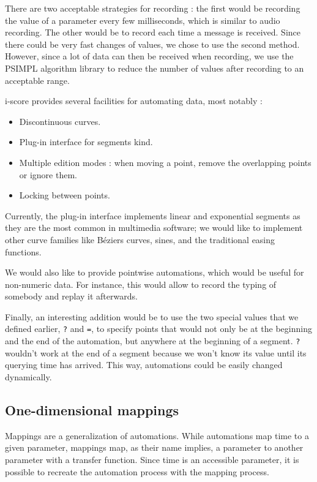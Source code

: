 \documentclass{sigchi}
\begin{document}
There are two acceptable strategies for recording : the first would be recording the value of a parameter every few milliseconds, which is similar to audio recording. The other would be to record each time a message is received. Since there could be very fast changes of values, we chose to use the second method.
However, since a lot of data can then be received when recording, we use the PSIMPL\cite{psimpl} algorithm library to reduce the number of values after recording to an acceptable range.

i-score provides several facilities for automating data, most notably : 
\begin{itemize}
    \item Discontinuous curves.
    \item Plug-in interface for segments kind.
    \item Multiple edition modes : when moving a point, remove the overlapping points or ignore them.
    \item Locking between points.
\end{itemize}

Currently, the plug-in interface implements linear and exponential segments as they are the most common in multimedia software; we would like to implement other curve families like Béziers curves, sines, and the traditional easing functions\cite{hudson1993animation}.

We would also like to provide pointwise automations, which would be useful for non-numeric data. For instance, this would allow to record the typing of somebody and replay it afterwards.

Finally, an interesting addition would be to use the two special values that we defined earlier, \texttt{?} and \texttt{=}, to specify points that would not only be at the beginning and the end of the automation, but anywhere at the beginning of a segment. \texttt{?} wouldn't work at the end of a segment because we won't know its value until its querying time has arrived. This way, automations could be easily changed dynamically.

\subsection{One-dimensional mappings}
Mappings are a generalization of automations. While automations map time to a given parameter, mappings map, as their name implies, a parameter to another parameter with a transfer function. Since time is an accessible parameter, it is possible to recreate the automation process with the mapping process.
\end{document}
